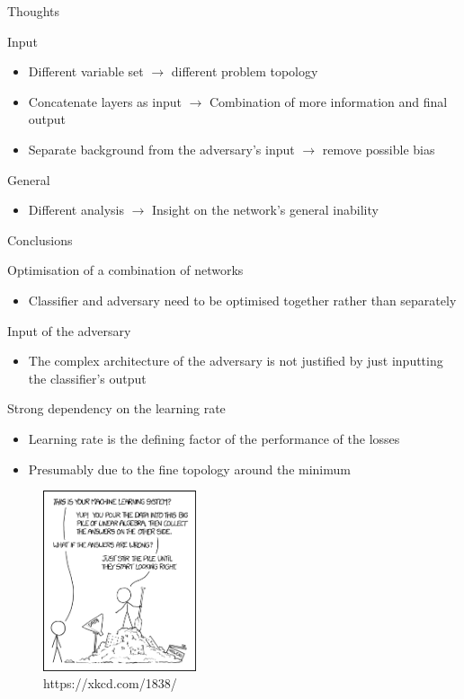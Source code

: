 \begin{frame}{Thoughts}
    \begin{block}{Input}
        \begin{itemize}
            \item Different variable set $\rightarrow$ different problem topology
            \item Concatenate layers as input $\rightarrow$ Combination of more information and final output
            \item Separate background from the adversary's input $\rightarrow$ remove possible bias
        \end{itemize}
    \end{block}
    \begin{block}{General}
        \begin{itemize}
            \item Different analysis $\rightarrow$ Insight on the network's general inability
        \end{itemize}
    \end{block}
\end{frame}

\begin{frame}{Conclusions}
    \begin{block}{Optimisation of a combination of networks}
        \begin{itemize}
            \item Classifier and adversary need to be optimised together rather than separately
        \end{itemize}
    \end{block}
    \begin{block}{Input of the adversary}
        \begin{itemize}
            \item The complex architecture of the adversary is not justified by just inputting the classifier's output
        \end{itemize}
    \end{block}
    \begin{block}{Strong dependency on the learning rate}
        \begin{itemize}
            \item Learning rate is the defining factor of the performance of the losses
            \item Presumably due to the fine topology around the minimum
        \end{itemize}
    \end{block}
\end{frame}

\begin{frame}{}
    \begin{figure}
        \centering
        \includegraphics[width=0.4\textwidth]{xkcd}
        \caption{https://xkcd.com/1838/}
    \end{figure}
\end{frame}